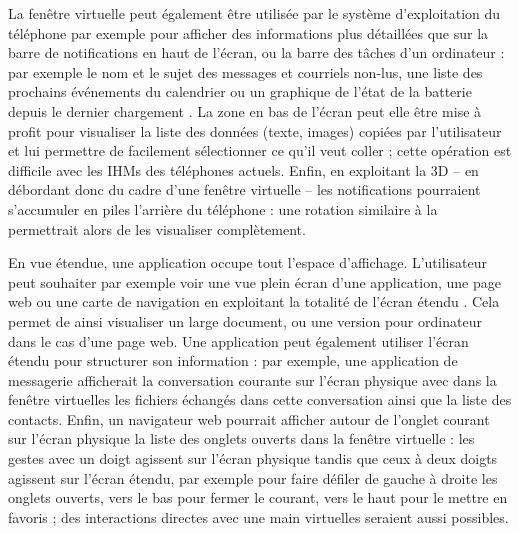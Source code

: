 La fenêtre virtuelle peut également être utilisée par le système d'exploitation du téléphone par exemple pour afficher des informations plus détaillées que sur la barre de notifications en haut de l'écran, ou la barre des tâches d'un ordinateur : par exemple le nom et le sujet des messages et courriels non-lus, une liste des prochains événements du calendrier ou un graphique de l'état de la batterie depuis le dernier chargement . La zone en bas de l'écran peut elle être mise à profit pour visualiser la liste des données (texte, images) copiées par l'utilisateur et lui permettre de facilement sélectionner ce qu'il veut coller ; cette opération est difficile avec les IHMs des téléphones actuels. Enfin, en exploitant la 3D -- en débordant donc du cadre d'une fenêtre virtuelle -- les notifications pourraient s'accumuler en piles l'arrière du téléphone : une rotation similaire à la  permettrait alors de les visualiser complètement.


En vue étendue, une application occupe tout l'espace d'affichage. L'utilisateur peut souhaiter par exemple voir une vue plein écran d'une application, une page web ou une carte de navigation en exploitant la totalité de l'écran étendu . Cela permet de ainsi visualiser un large document, ou une version pour ordinateur dans le cas d'une page web. Une application peut également utiliser l'écran étendu pour structurer son information : par exemple, une application de messagerie afficherait la conversation courante sur l'écran physique avec dans la fenêtre virtuelles les fichiers échangés dans cette conversation ainsi que la liste des contacts. Enfin, un navigateur web pourrait afficher autour de l'onglet courant sur l'écran physique la liste des onglets ouverts dans la fenêtre virtuelle : les gestes avec un doigt agissent sur l'écran physique tandis que ceux à deux doigts agissent sur l'écran étendu, par exemple pour faire défiler de gauche à droite les onglets ouverts, vers le bas pour fermer le courant, vers le haut pour le mettre en favoris ; des interactions directes avec une main virtuelles seraient aussi possibles.

